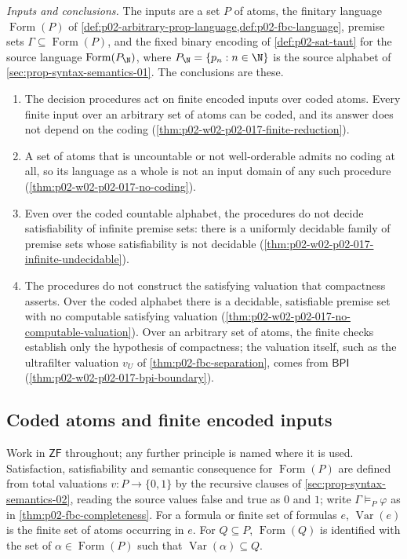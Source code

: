 \emph{Inputs and conclusions.}  The inputs are a set \(P\) of atoms, the
finitary language \(\operatorname{Form}(P)\) of
\cref{def:p02-arbitrary-prop-language,def:p02-fbc-language}, premise
sets \(\Gamma\subseteq\operatorname{Form}(P)\), and the fixed binary
encoding of \cref{def:p02-sat-taut} for the source language
\(\operatorname{Form}(P_{\N})\), where \(P_{\N}=\{p_n:n\in\N\}\) is the
source alphabet of \cref{sec:prop-syntax-semantics-01}.  The conclusions are these.
\begin{enumerate}
 \item The decision procedures act on finite encoded inputs over coded
       atoms.  Every finite input over an arbitrary set of atoms can be
       coded, and its answer does not depend on the coding
       (\cref{thm:p02-w02-p02-017-finite-reduction}).
 \item A set of atoms that is uncountable or not well-orderable admits
       no coding at all, so its language as a whole is not an input
       domain of any such procedure
       (\cref{thm:p02-w02-p02-017-no-coding}).
 \item Even over the coded countable alphabet, the procedures do not
       decide satisfiability of infinite premise sets: there is a
       uniformly decidable family of premise sets whose satisfiability
       is not decidable
       (\cref{thm:p02-w02-p02-017-infinite-undecidable}).
 \item The procedures do not construct the satisfying valuation that
       compactness asserts.  Over the coded alphabet there is a decidable,
       satisfiable premise set with no computable satisfying valuation
       (\cref{thm:p02-w02-p02-017-no-computable-valuation}).  Over an
       arbitrary set of atoms, the finite checks establish only the
       hypothesis of compactness; the valuation itself, such as the
       ultrafilter valuation \(v_U\) of \cref{thm:p02-fbc-separation},
       comes from \(\mathsf{BPI}\)
       (\cref{thm:p02-w02-p02-017-bpi-boundary}).
\end{enumerate}

\subsection{Coded atoms and finite encoded inputs}
\label{sec:p02-w02-p02-017-coded-inputs}

Work in \(\mathsf{ZF}\) throughout; any further principle is named where
it is used.  Satisfaction, satisfiability and semantic consequence for
\(\operatorname{Form}(P)\) are defined from total valuations
\(v:P\to\{0,1\}\) by the recursive clauses of
\cref{sec:prop-syntax-semantics-02}, reading the source values false and true
as \(0\) and \(1\); write \(\Gamma\models_P\varphi\) as in
\cref{thm:p02-fbc-completeness}.  For a formula or finite set of
formulas \(e\), \(\operatorname{Var}(e)\) is the finite set of atoms
occurring in \(e\).  For \(Q\subseteq P\), \(\operatorname{Form}(Q)\) is
identified with the set of \(\alpha\in\operatorname{Form}(P)\) such that
\(\operatorname{Var}(\alpha)\subseteq Q\).

